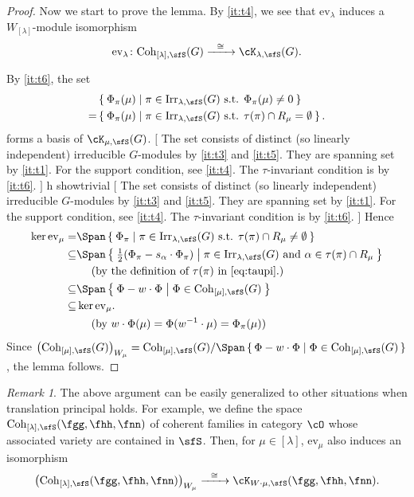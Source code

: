 \documentclass[12pt,a4paper]{amsart}
\newcommand{\trivial}[2][]{\if\relax\detokenize{#1}\relax
  {%
      \color{orange} \vspace{0em} $[$  #2 $]$
      \color{black}
  }
  \else
\ifx#1h
\ifcsname showtrivial\endcsname
{%
    \color{orange} \vspace{0em}  $[$ #2 $]$
    \color{black}
}
\fi
\else {\red Wrong argument!} \fi
\fi
}
\numberwithin{equation}{section}
\theoremstyle{remark}
\newtheorem{remark}[thm]{Remark}
\def\half{{\tfrac{1}{2}}}
\def\Irr{\mathrm{Irr}}
\def\WLam{W_{\Lam}}
\def\Coh{\mathrm{Coh}}
\def\ev#1{{\mathrm{ev}_{#1}}}
\newcommand{\Lam}{{[\lambda]}}
\newcommand{\Grt}{\cK}
\begin{document}
\begin{proof}
  Now we start to prove the lemma. By \ref{it:t4}, we see that $\ev{\lambda}$
  induces a $\WLam$-module isomorphism
  \[
    \ev{\lambda} \colon \Coh_{[\lambda],\sfS}(G) \xrightarrow{\ \ \cong \ \ } \Grt_{\lambda,\sfS}(G).
  \]

  By \ref{it:t6}, the set %
  \[
    \begin{split}
      & \Set{\Phi_{\pi}(\mu)| \pi\in \Irr_{\lambda, \sfS}(G)
        \text{ s.t. } \Phi_{\pi}(\mu)\neq 0} \\
      = & \Set{\Phi_{\pi}(\mu)| \pi\in \Irr_{\lambda, \sfS}(G) \text{ s.t.
        } \tau(\pi)\cap R_{\mu}= \emptyset}.
    \end{split}
  \]
  forms a basis of $\Grt_{\mu,\sfS}(G)$. \trivial{ The set consists of distinct
    (so linearly independent) irreducible $G$-modules by \ref{it:t3} and
    \ref{it:t5}. They are spanning set by \ref{it:t1}. For the support
    condition, see \ref{it:t4}. The $\tau$-invariant condition is by
    \ref{it:t6}.
  } Hence
  \[
    \begin{split}
      \ker \ev{\mu} = & \Span \Set{\Phi_{\pi}| \pi\in \Irr_{\lambda, \sfS}(G) \text{
          s.t. }
        \tau(\pi)\cap R_{\mu}\neq \emptyset}\\
      \subseteq & \Span \Set{\half(\Phi_\pi - s_{\alpha}\cdot \Phi_{\pi}) | \pi\in \Irr_{\lambda, \sfS}(G) \text{
          and } \alpha \in
        \tau(\pi)\cap R_{\mu}}\\
      & \ \ \ \  \text{(by the definition of $\tau(\pi)$ in \eqref{eq:taupi}.)} \\
      \subseteq &\Span\Set{\Phi- w\cdot \Phi |\Phi\in \Coh_{[\mu],\sfS}(G)} \\
      \subseteq & \ker \ev{\mu}. \\
      &\ \ \ \ \text{(by
        $w\cdot \Phi(\mu) = \Phi(w^{-1}\cdot \mu)=\Phi_\pi(\mu)$)}
    \end{split}
  \]
  Since
  $\left(\Coh_{[\mu],\sfS}(G)\right)_{W_{\mu}} =\Coh_{[\mu],\sfS}(G)\slash \Span\set{\Phi- w\cdot \Phi |\Phi\in \Coh_{[\mu],\sfS}(G)} $,
  the lemma follows.
\end{proof}

\begin{remark}
  The above argument can be easily generalized to other situations when
  translation principal holds. For example, we define the space
  $\Coh_{\Lam,\sfS}(\fgg,\fhh,\fnn)$ of coherent families in category $\cO$
  whose associated variety are contained in $\sfS$. Then, for $\mu\in \Lam$,
  $\ev{\mu}$ also induces an isomorphism
  \[
    \left(\Coh_{[\lambda],\sfS}(\fgg,\fhh,\fnn)\right)_{W_{\mu}} \xrightarrow{\ \ \cong \ \ } \Grt_{W\cdot \mu,\sfS}(\fgg,\fhh,\fnn).
  \]
\end{remark}
\end{document}
